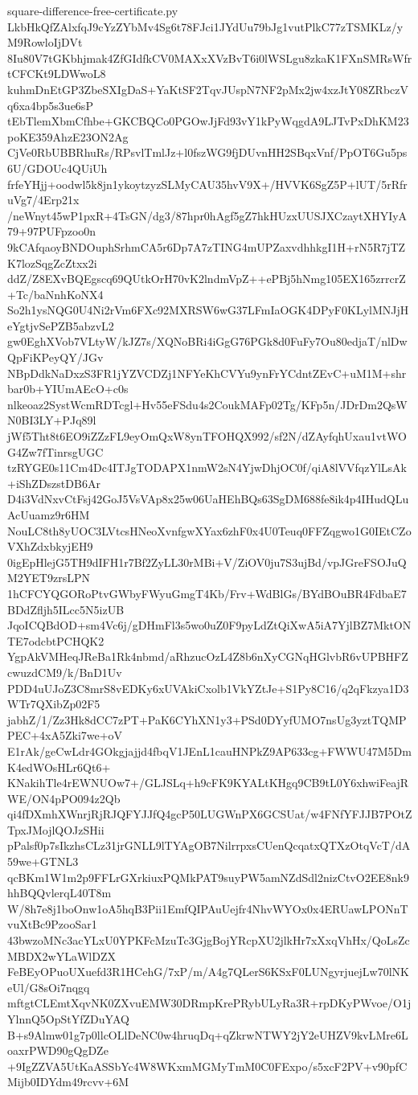 \documentclass[11pt]{article}
\theoremstyle{definition}
\theoremstyle{remark}
\begin{document}
\begin{filecontents*}[overwrite]{square-difference-free-certificate.py}
LkbHkQfZAlxfqJ9cYzZYbMv4Sg6t78FJci1JYdUu79bJg1vutPlkC77zTSMKLz/yM9RowloIjDVt
8Iu80V7tGKbhjmak4ZfGIdfkCV0MAXxXVzBvT6i0lWSLgu8zkaK1FXnSMRsWfrtCFCKt9LDWwoL8
kuhmDnEtGP3ZbeSXIgDaS+YaKtSF2TqvJUspN7NF2pMx2jw4xzJtY08ZRbczVq6xa4bp5s3ue6sP
tEbTlemXbmCfhbe+GKCBQCo0PGOwJjFd93vY1kPyWqgdA9LJTvPxDhKM23poKE359AhzE23ON2Ag
CjVe0RbUBBRhuRs/RPsvlTmlJz+l0fszWG9fjDUvnHH2SBqxVnf/PpOT6Gu5ps6U/GDOUc4QUiUh
frfeYHjj+oodwl5k8jn1ykoytzyzSLMyCAU35hvV9X+/HVVK6SgZ5P+lUT/5rRfruVg7/4Erp21x
/neWnyt45wP1pxR+4TsGN/dg3/87hpr0hAgf5gZ7hkHUzxUUSJXCzaytXHYIyA79+97PUFpzoo0n
9kCAfqaoyBNDOuphSrhmCA5r6Dp7A7zTING4mUPZaxvdhhkgI1H+rN5R7jTZK7lozSqgZcZtxx2i
ddZ/Z8EXvBQEgscq69QUtkOrH70vK2lndmVpZ++ePBj5hNmg105EX165zrrcrZ+Tc/baNnhKoNX4
So2h1ysNQG0U4Ni2rVm6FXc92MXRSW6wG37LFmIaOGK4DPyF0KLylMNJjHeYgtjvSePZB5abzvL2
gw0EghXVob7VLtyW/kJZ7s/XQNoBRi4iGgG76PGk8d0FuFy7Ou80edjaT/nlDwQpFiKPeyQY/JGv
NBpDdkNaDxzS3FR1jYZVCDZj1NFYeKhCVYu9ynFrYCdntZEvC+uM1M+shrbar0b+YIUmAEcO+c0s
nlkeoaz2SystWcmRDTcgl+Hv55eFSdu4s2CoukMAFp02Tg/KFp5n/JDrDm2QsWN0BI3LY+PJq89l
jWf5Tht8t6EO9iZZzFL9eyOmQxW8ynTFOHQX992/sf2N/dZAyfqhUxau1vtWOG4Zw7fTinrsgUGC
tzRYGE0s11Cm4Dc4ITJgTODAPX1nmW2sN4YjwDhjOC0f/qiA8lVVfqzYlLsAk+iShZDszstDB6Ar
D4i3VdNxvCtFsj42GoJ5VsVAp8x25w06UaHEhBQs63SgDM688fe8ik4p4IHudQLuAcUuamz9r6HM
NouLC8th8yUOC3LVtcsHNeoXvnfgwXYax6zhF0x4U0Teuq0FFZqgwo1G0IEtCZoVXhZdxbkyjEH9
0igEpHlejG5TH9dIFH1r7Bf2ZyLL30rMBi+V/ZiOV0ju7S3ujBd/vpJGreFSOJuQM2YET9zrsLPN
1hCFCYQGORoPtvGWbyFWyuGmgT4Kb/Frv+WdBlGs/BYdBOuBR4FdbaE7BDdZfljh5ILcc5N5izUB
JqoICQBdOD+sm4Vc6j/gDHmFl3s5wo0uZ0F9pyLdZtQiXwA5iA7YjlBZ7MktONTE7odcbtPCHQK2
YgpAkVMHeqJReBa1Rk4nbmd/aRhzucOzL4Z8b6nXyCGNqHGlvbR6vUPBHFZcwuzdCM9/k/BnD1Uv
PDD4uUJoZ3C8mrS8vEDKy6xUVAkiCxolb1VkYZtJe+S1Py8C16/q2qFkzya1D3WTr7QXibZp02F5
jabhZ/1/Zz3Hk8dCC7zPT+PaK6CYhXN1y3+PSd0DYyfUMO7nsUg3yztTQMPPEC+4xA5Zki7we+oV
E1rAk/geCwLdr4GOkgjajjd4fbqV1JEnL1cauHNPkZ9AP633cg+FWWU47M5DmK4edWOsHLr6Qt6+
KNakihTle4rEWNUOw7+/GLJSLq+h9cFK9KYALtKHgq9CB9tL0Y6xhwiFeajRWE/ON4pPO094z2Qb
qi4fDXmhXWnrjRjRJQFYJJfQ4gcP50LUGWnPX6GCSUat/w4FNfYFJJB7POtZTpxJMojlQOJzSHii
pPalsf0p7sIkzhsCLz31jrGNLL9lTYAgOB7NilrrpxsCUenQcqatxQTXzOtqVcT/dA59we+GTNL3
qcBKm1W1m2p9FFLrGXrkiuxPQMkPAT9suyPW5amNZdSdl2nizCtvO2EE8nk9hhBQQvlerqL40T8m
W/8h7e8j1boOnw1oA5hqB3Pii1EmfQIPAuUejfr4NhvWYOx0x4ERUawLPONnTvuXtBc9PzooSar1
43bwzoMNc3acYLxU0YPKFcMzuTc3GjgBojYRcpXU2jlkHr7xXxqVhHx/QoLsZcMBDX2wYLaWlDZX
FeBEyOPuoUXuefd3R1HCehG/7xP/m/A4g7QLerS6KSxF0LUNgyrjuejLw70lNKeUl/G8sOi7nqgq
mftgtCLEmtXqvNK0ZXvuEMW30DRmpKrePRybULyRa3R+rpDKyPWvoe/O1jYlnnQ5OpStYfZDuYAQ
B+s9Almw01g7p0llcOLlDeNC0w4hruqDq+qZkrwNTWY2jY2eUHZV9kvLMre6LoaxrPWD90gQgDZe
+9IgZZVA5UtKaASSbYc4W8WKxmMGMyTmM0C0FExpo/s5xcF2PV+v90pfCMijb0IDYdm49rcvv+6M

\end{filecontents*}
\end{document}
